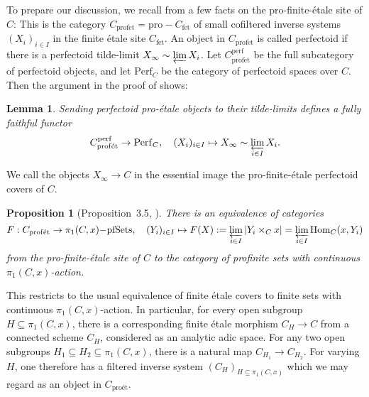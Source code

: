 \documentclass[10pt,oneside]{amsart}
\newtheorem{lemma}[theorem]{Lemma}
\newtheorem{proposition}[theorem]{Proposition}
\theoremstyle{definition}
\newcommand{\Hom}{\operatorname{Hom}}
\newcommand{\perf}{{\operatorname{perf}}}
\newcommand{\fet}{\operatorname{f\acute{e}t}}
\newcommand{\profet}{\operatorname{prof\acute{e}t}}
\begin{document}
	To prepare our discussion, we recall from \cite[\S3]{p-adic_Hodge} a few facts on the pro-finite-\'etale site of $C$: This is the category $C_{\profet}=\mathrm{pro-}C_{\fet}$ of small cofiltered inverse systems $(X_i)_{i\in I}$ in the finite \'etale site $C_{\fet}$. An object in $C_{\profet}$ is called perfectoid if there is a perfectoid tilde-limit $X_\infty\sim \varprojlim X_i$. Let $C_{\profet}^{\perf}$ be the full subcategory of perfectoid objects, and let $\mathrm{Perf}_C$ be the category of perfectoid spaces over $C$. Then the argument in the proof of \cite[Lemma 8.2.3]{berkeley} shows:
\begin{lemma}\label{l:profet-perf-tilde-limit-fully-faithful}
	Sending perfectoid pro-\'etale objects to their tilde-limits defines a fully faithful functor
	\[C_{\profet}^{\perf}\to  \mathrm{Perf}_{C},\quad (X_i)_{i\in I}\mapsto X_\infty\sim \varprojlim_{i\in I} X_i.\]
\end{lemma}
	We call the objects $X_\infty \to C$ in the essential image the pro-finite-\'etale perfectoid covers of $C$.
	\begin{proposition}[Proposition~3.5, \cite{p-adic_Hodge}]
		There is an equivalence of categories
		\[ F:C_{\mathrm{prof\acute{e}t}}\to \pi_{1}(C,x)\mathrm{-pfSets},\quad (Y_i)_{i\in I} \mapsto F(X):=\varprojlim_{i\in I}|Y_i\times_{C}x|=\varprojlim_{i\in I}\Hom_C(x,Y_i)\]
		from the pro-finite-\'etale site of $C$ to the category of profinite sets with continuous $\pi_{1}(C,x)$-action.
	\end{proposition}
	This restricts to the usual equivalence of finite \'etale covers to finite sets with continuous $\pi_{1}(C,x)$-action. 
	In particular, for every open subgroup $H\subseteq \pi_1(C,x)$, there is a corresponding finite \'etale morphism $C_H\to C$ from a connected scheme $C_H$, considered as an analytic adic space. For any two open subgroups $H_1\subseteq H_2\subseteq \pi_1(C,x)$, there is a natural map $C_{H_1}\to C_{H_2}$. For varying $H$, one therefore has a filtered inverse system $(C_H)_{H\subseteq \pi_1(C,x)}$ which we may regard as an object in $C_{\text{pro\'et}}$.
\end{document}
